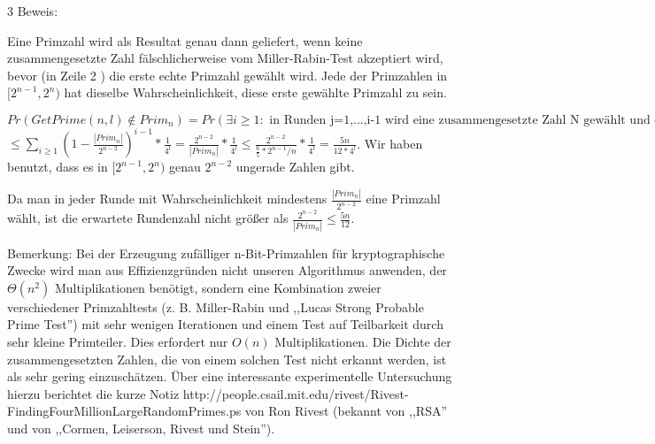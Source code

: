 \documentclass[a4paper]{article}
\begin{document}
\begin{multicols}{3}
        Beweis:
        \begin{enumerate*}
            \item Eine Primzahl wird als Resultat genau dann geliefert, wenn keine zusammengesetzte Zahl fälschlicherweise vom Miller-Rabin-Test akzeptiert wird, bevor (in Zeile 2 ) die erste echte Primzahl gewählt wird. Jede der Primzahlen in $[2^{n-1}, 2^n)$ hat dieselbe Wahrscheinlichkeit, diese erste gewählte Primzahl zu sein.
            \item $Pr(GetPrime(n,l)\not\in Prim_n)= Pr(\exists i\geq 1 :\text{ in Runden j=1,...,i-1 wird eine zusammengesetzte Zahl N gewählt und erkannt}\wedge\text{in Runde i wird zusammengesetzte Zahl N gewählt und der iterierte MiRa-Test auf N liefert 0})$ $\leq\sum_{i\geq 1} (1 -\frac{|Prim_n|}{2^{n-2}})^{i-1}*\frac{1}{4^l} = \frac{2^{n-2}}{|Prim_n|} *\frac{1}{4^l} \leq \frac{2^{n-2}}{\frac{6}{5} *2^{n-1} /n}*\frac{1}{4^l} = \frac{5n}{12 * 4^l}$. Wir haben benutzt, dass es in $[2^{n-1}, 2^n)$ genau $2^{n-2}$ ungerade Zahlen gibt.
            \item Da man in jeder Runde mit Wahrscheinlichkeit mindestens $\frac{|Prim_n|}{2^{n-2}}$ eine Primzahl wählt, ist die erwartete Rundenzahl nicht größer als $\frac{2^{n-2}}{|Prim_n|} \leq \frac{5n}{12}$.
        \end{enumerate*}

        Bemerkung: Bei der Erzeugung zufälliger n-Bit-Primzahlen für kryptographische Zwecke wird man aus Effizienzgründen nicht unseren Algorithmus anwenden, der $\Theta (n^2)$ Multiplikationen benötigt, sondern eine Kombination zweier verschiedener Primzahltests (z. B. Miller-Rabin und ,,Lucas Strong Probable Prime Test'') mit sehr wenigen Iterationen und einem Test auf Teilbarkeit durch sehr kleine Primteiler. Dies erfordert nur $O(n)$ Multiplikationen. Die Dichte der zusammengesetzten Zahlen, die von einem solchen Test nicht erkannt werden, ist als sehr gering einzuschätzen. Über eine interessante experimentelle Untersuchung hierzu berichtet die kurze Notiz http://people.csail.mit.edu/rivest/Rivest-FindingFourMillionLargeRandomPrimes.ps von Ron Rivest (bekannt von ,,RSA'' und von ,,Cormen, Leiserson, Rivest und Stein'').


\end{multicols}
\end{document}
